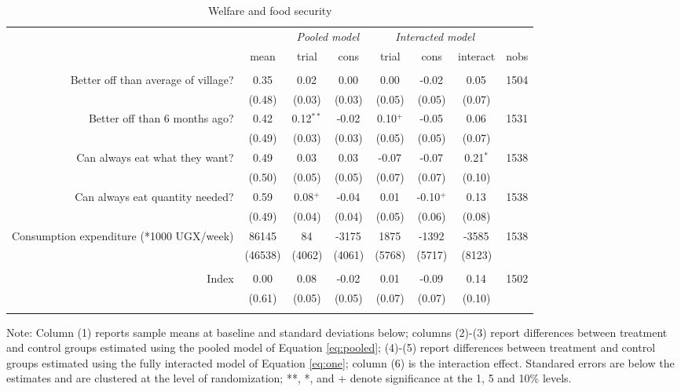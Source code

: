 \documentclass[english]{article}\usepackage[]{graphicx}\usepackage[]{xcolor}
\begin{document}
\begin{sidewaystable}
\caption{Welfare and food security\label{welfare}}

\footnotesize
\begin{center}
\begin{tabular}{rccccccc}
\hline\hline
& & \multicolumn{2}{c}{\textit{Pooled model}} & \multicolumn{3}{c}{\textit{Interacted model}} \\
& mean & trial & cons & trial & cons & interact & nobs \\
\hline
\\
Better off than average of village?
& 0.35
& 0.02$^{}$
& 0.00$^{}$ 
& 0.00$^{}$ 
& -0.02$^{}$
& 0.05$^{}$ & 1504 \\

& (0.48) & (0.03)  & (0.03) & (0.05)  & (0.05)  & (0.07)
 \\

Better off than 6 months ago?
& 0.42
& 0.12$^{**}$
& -0.02$^{}$ 
& 0.10$^{+}$ 
& -0.05$^{}$
& 0.06$^{}$ & 1531 \\

& (0.49) & (0.03)  & (0.03) & (0.05)  & (0.05)  & (0.07)
 \\

Can always eat what they want?
& 0.49
& 0.03$^{}$
& 0.03$^{}$ 
& -0.07$^{}$ 
& -0.07$^{}$
& 0.21$^{*}$ & 1538 \\

& (0.50) & (0.05)  & (0.05) & (0.07)  & (0.07)  & (0.10)
 \\

Can always eat quantity needed?
& 0.59
& 0.08$^{+}$
& -0.04$^{}$ 
& 0.01$^{}$ 
& -0.10$^{+}$
& 0.13$^{}$ & 1538 \\

& (0.49) & (0.04)  & (0.04) & (0.05)  & (0.06)  & (0.08)
 \\

Consumption expenditure (*1000 UGX/week)
& 86145
& 84$^{}$
& -3175$^{}$ 
& 1875$^{}$ 
& -1392$^{}$
& -3585$^{}$ & 1538 \\

& (46538) & (4062)  & (4061) & (5768)  & (5717)  & (8123)
 \\
\\
Index
& 0.00
& 0.08$^{}$
& -0.02$^{}$ 
& 0.01$^{}$ 
& -0.09$^{}$
& 0.14$^{}$ & 1502 \\

& (0.61) & (0.05)  & (0.05) & (0.07)  & (0.07)  & (0.10)
 \\
\\
\hline\hline
\end{tabular}
\end{center}
\scriptsize
Note: Column (1) reports sample means at baseline and standard deviations below;  columns (2)-(3) report differences between treatment and control groups estimated using the pooled model of Equation  \ref{eq:pooled}; (4)-(5) report differences between treatment and control groups estimated using the fully interacted model of Equation \ref{eq:one}; column (6) is the interaction effect. Standared errors are below the estimates and are clustered at the level of randomization; **, *, and + denote significance at the 1, 5 and 10\% levels.
\end{sidewaystable}
\end{document}
